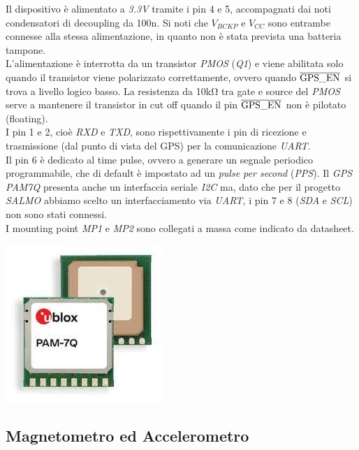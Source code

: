 \noindent Il dispositivo è alimentato a \emph{3.3V} tramite i pin 4 e 5,
accompagnati dai noti condensatori di decoupling da 100n.
Si noti che $V_{BCKP}$ e $V_{CC}$ sono entrambe connesse alla stessa
alimentazione, in quanto non è stata prevista una batteria tampone. \\
L'alimentazione è interrotta da un transistor \emph{PMOS} (\emph{Q1}) e
viene abilitata solo quando il transistor viene polarizzato
correttamente, ovvero quando $\overline{\rm {GPS\_{EN}}}$ si trova a
livello logico basso. La resistenza da 10kΩ tra gate e source del \textit{PMOS}
serve a mantenere il transistor in cut off quando il pin
$\overline{\rm {GPS\_{EN}}}$ non è pilotato (floating).\\
I pin 1 e 2, cioè \emph{RXD} e \emph{TXD}, sono rispettivamente i pin di
ricezione e trasmissione (dal punto di vista del GPS) per la comunicazione \emph{UART}.\\
Il pin 6 è dedicato al time pulse, ovvero a generare un segnale
periodico programmabile, che di default è impostato ad un \textit{pulse per second} (\textit{PPS}). Il \emph{GPS}
\emph{PAM7Q} presenta anche un interfaccia seriale \emph{I2C} ma, dato
che per il progetto \emph{SALMO} abbiamo scelto un interfacciamento via
\emph{UART,} i pin 7 e 8 (\emph{SDA} e \emph{SCL}) non sono stati connessi.\\
I mounting point \emph{MP1} e \emph{MP2} sono collegati a massa come
indicato da datasheet.

\begin{center}
\includegraphics[scale=0.8]{figures/image30.jpg}
\captionsetup{type=figure}
\end{center}

\hypertarget{magnetometro-ed-accelerometro}{%
\subsection{\texorpdfstring{Magnetometro ed Accelerometro}{Magnetometro ed Accelerometro}}\label{magnetometro-ed-accelerometro}}

